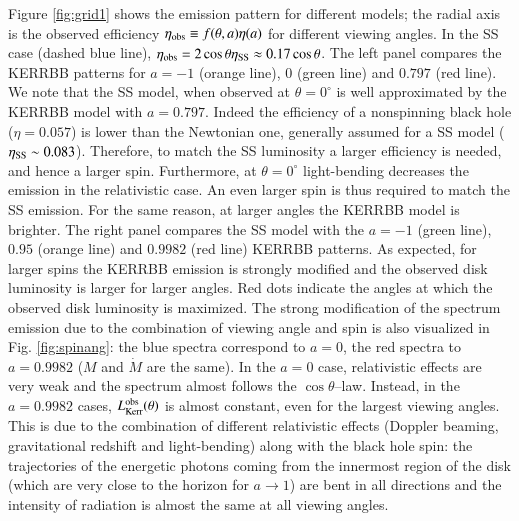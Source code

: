\documentclass{aa}
\begin{document}
Figure \ref{fig:grid1} shows the emission pattern for different models; the radial axis is the observed efficiency $\eta_{\rm obs} \equiv f(\theta,a) \eta(a)$ for different viewing angles. In the SS case (dashed blue line), $\eta_{\rm obs} = 2 \cos \theta \eta_{\rm SS} \approx 0.17 \cos \theta$. The left panel compares the KERRBB patterns for $a = -1$ (orange line), $0$ (green line) and $0.797$ (red line). We note that the SS model, when observed at $\theta = 0^{\circ}$ is well approximated by the KERRBB model with $a = 0.797$. Indeed the efficiency of a nonspinning black hole ($\eta=0.057$) is lower than the Newtonian one, generally assumed for a SS model ($\eta_{\rm SS} \sim 0.083$). Therefore, to match the SS luminosity a larger efficiency is needed, and hence a larger spin. Furthermore, at $\theta = 0^{\circ}$ light-bending decreases the emission in the relativistic case. An even larger spin is thus required to match the SS emission. For the same reason, at larger angles the KERRBB model is brighter. The right panel compares the SS model with the $a = -1$ (green line), $0.95$ (orange line) and $0.9982$ (red line) KERRBB patterns. As expected, for larger spins the KERRBB emission is strongly modified and the observed disk luminosity is larger for larger angles. Red dots indicate the angles at which the observed disk luminosity is maximized. The strong modification of the spectrum emission due to the combination of viewing angle and spin is also visualized in Fig. \ref{fig:spinang}: the blue spectra correspond to $a = 0$, the red spectra to $a = 0.9982$ ($M$ and $\dot{M}$ are the same). In the $a = 0$ case, relativistic effects are very weak and the spectrum almost follows the $\cos\theta$--law. Instead, in the $a = 0.9982$ cases, $L^{\rm obs}_{\rm Kerr} (\theta)$ is almost constant, even for the largest viewing angles. This is due to the combination of different relativistic effects (Doppler beaming, gravitational redshift and light-bending) along with the black hole spin: the trajectories of the energetic photons coming from the innermost region of the disk (which are very close to the horizon for $a \to 1$) are bent in all directions and the intensity of radiation is almost the same at all viewing angles.    
\end{document}
